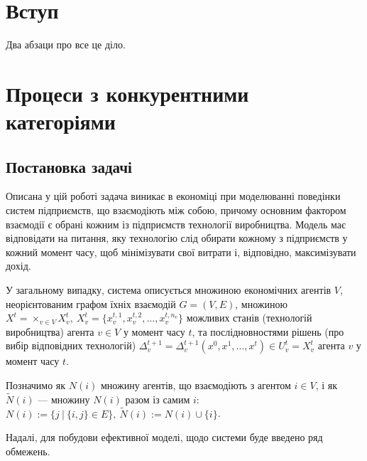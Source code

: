 \documentclass[oneside,draft,14pt]{extarticle}
\begin{document}

\setcounter{page}{2}

\tableofcontents
\clearpage

\section{Вступ}

Два абзаци про все це діло.

\section{Процеси з конкурентними категоріями}

\subsection{Постановка задачі}

Описана у цій роботі задача виникає в економіці\cite{David:1998} при моделюванні поведінки систем підприємств, що взаємодіють між собою, причому основним фактором взаємодії є обрані кожним із підприємств технології виробництва. Модель має відповідати на питання, яку технологію слід обирати кожному з підприємств у кожний момент часу, щоб мінімізувати свої витрати і, відповідно, максимізувати дохід. 

У загальному випадку, система описується\cite{Chornei:2005} множиною економічних агентів \(V\), неорієнтованим графом їхніх взаємодій \(G = (V, E)\), множиною \(X^t = \times_{v \in V}X_v^t,\ X_v^t = \{x^{t,1}_v, x^{t,2}_v, \ldots, x^{t,n_v}_v\}\) можливих станів (технологій виробництва) агента \(v \in V\) у момент часу \(t\), та послідновностями рішень (про вибір відповідних технологій) \(\Delta_v^{t+1} = \Delta_v^{t+1}(x^0, x^1, \ldots, x^t) \in U_v^t = X_v^t\) агента \(v\) у момент часу \(t\).

Позначимо як \(N(i)\) множину агентів, що взаємодіють з агентом \(i \in V\), і як \(\tilde{N}(i)\) — множину \(N(i)\) разом із самим \(i\):
\(N(i) := \{j\ |\ \{i, j\} \in E\},\ \tilde{N}(i) := N(i) \cup \{i\}\).

Надалі, для побудови ефективної моделі, щодо системи буде введено ряд обмежень.
\end{document}
